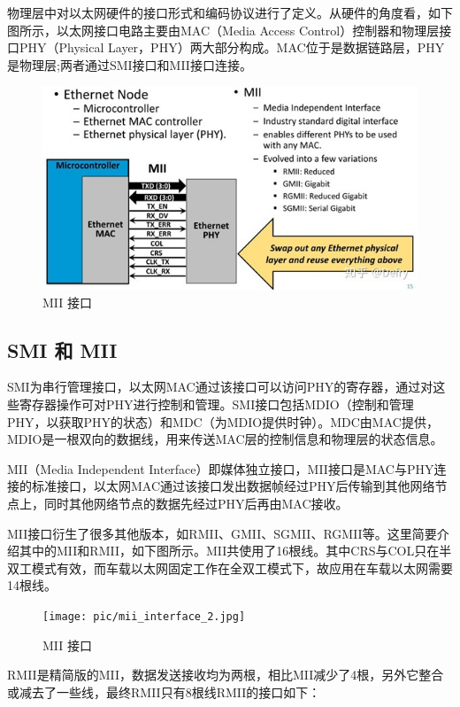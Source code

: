 物理层中对以太网硬件的接口形式和编码协议进行了定义。从硬件的角度看，如下图所示，以太网接口电路主要由MAC（Media Access Control）控制器和物理层接口PHY（Physical Layer，PHY）两大部分构成。MAC位于是数据链路层，PHY是物理层;两者通过SMI接口和MII接口连接。

\begin{figure}[ht]
    \centering
    \includegraphics[scale=1]{pic/mii_interface.jpg}
    \caption{MII 接口}
    \label{fig:mii_interface}
\end{figure}

\subsection{SMI 和 MII}
SMI为串行管理接口，以太网MAC通过该接口可以访问PHY的寄存器，通过对这些寄存器操作可对PHY进行控制和管理。SMI接口包括MDIO（控制和管理PHY，以获取PHY的状态）和MDC（为MDIO提供时钟）。MDC由MAC提供，MDIO是一根双向的数据线，用来传送MAC层的控制信息和物理层的状态信息。

MII（Media Independent Interface）即媒体独立接口，MII接口是MAC与PHY连接的标准接口，以太网MAC通过该接口发出数据帧经过PHY后传输到其他网络节点上，同时其他网络节点的数据先经过PHY后再由MAC接收。	

MII接口衍生了很多其他版本，如RMII、GMII、SGMII、RGMII等。这里简要介绍其中的MII和RMII，如下图所示。MII共使用了16根线。其中CRS与COL只在半双工模式有效，而车载以太网固定工作在全双工模式下，故应用在车载以太网需要14根线。

\begin{figure}[ht]
    \centering
    \texttt{[image: pic/mii\_interface\_2.jpg]}
    \caption{MII 接口}
    \label{fig:mii_interface2}
\end{figure}

RMII是精简版的MII，数据发送接收均为两根，相比MII减少了4根，另外它整合或减去了一些线，最终RMII只有8根线RMII的接口如下：

